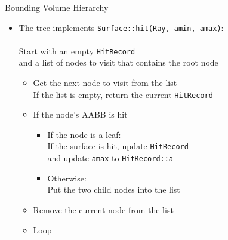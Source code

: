 \documentclass[utf8,stillsansserifmath,fleqn,t]{beamer}
\newcommand{\code}[1]{\texttt{#1}}
\begin{document}
\begin{frame}
\frametitle{\insertsection}
Bounding Volume Hierarchy
\begin{itemize}
\item The tree implements \code{Surface::hit(Ray, amin, amax)}:\\~\\
    Start with an empty \code{HitRecord}\\ and a list of nodes to visit that contains the root node
    \begin{itemize}
    \item Get the next node to visit from the list\\
        If the list is empty, return the current \code{HitRecord}
    \item If the node's AABB is hit
        \begin{itemize}
        \item If the node is a leaf:\\
              If the surface is hit, update \code{HitRecord}\\
              and update \code{amax} to \code{HitRecord::a}
        \item Otherwise:\\
              Put the two child nodes into the list
        \end{itemize}
    \item Remove the current node from the list
    \item Loop
    \end{itemize}
\end{itemize}
\end{frame}
\end{document}

